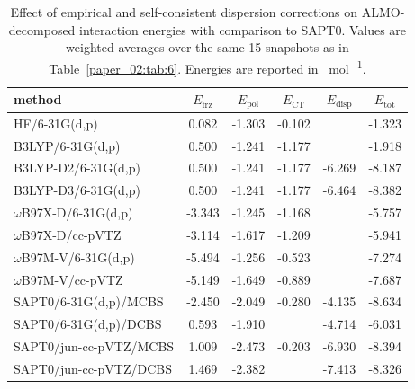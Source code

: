 \begin{table}
  \centering
  \caption[Effect of empirical and self-consistent dispersion corrections in ALMO-EDA]{Effect of empirical and self-consistent dispersion corrections on ALMO-decomposed interaction energies with comparison to SAPT0. Values are weighted averages over the same \num{15} snapshots as in Table~\ref{paper_02:tab:6}. Energies are reported in \si{\kcal\per\mole}.}
  \label{paper_02:tab:S3}
  \begin{tabular}{lccccc}
    \toprule
    method & \(E_{\text{frz}}\) & \(E_{\text{pol}}\) & \(E_{\text{CT}}\) & \(E_{\text{disp}}\) & \(E_{\text{tot}}\) \\
    \midrule
    HF/6-31G(d,p) & 0.082 & -1.303 & -0.102 & \textemdash{} & -1.323 \\
    B3LYP/6-31G(d,p) & 0.500 & -1.241 & -1.177 & \textemdash{} & -1.918 \\
    B3LYP-D2/6-31G(d,p) & 0.500 & -1.241 & -1.177 & -6.269 & -8.187 \\
    B3LYP-D3/6-31G(d,p) & 0.500 & -1.241 & -1.177 & -6.464 & -8.382 \\
    \(\omega\)B97X-D/6-31G(d,p) & -3.343 & -1.245 & -1.168 & \textemdash{} & -5.757 \\
    \(\omega\)B97X-D/cc-pVTZ & -3.114 & -1.617 & -1.209 & \textemdash{} & -5.941 \\
    \(\omega\)B97M-V/6-31G(d,p) & -5.494 & -1.256 & -0.523 & \textemdash{} & -7.274 \\
    \(\omega\)B97M-V/cc-pVTZ & -5.149 & -1.649 & -0.889 & \textemdash{} & -7.687 \\
    SAPT0/6-31G(d,p)/MCBS & -2.450 & -2.049 & -0.280 & -4.135 & -8.634 \\
    SAPT0/6-31G(d,p)/DCBS & 0.593 & -1.910 & & -4.714 & -6.031 \\
    SAPT0/jun-cc-pVTZ/MCBS & 1.009 & -2.473 & -0.203 & -6.930 & -8.394 \\
    SAPT0/jun-cc-pVTZ/DCBS & 1.469 & -2.382 & & -7.413 & -8.326 \\
    \bottomrule
  \end{tabular}
\end{table}

